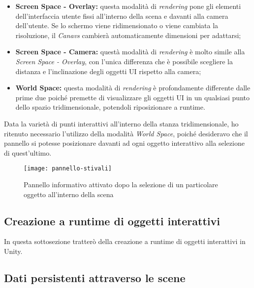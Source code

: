 \begin{itemize}
	\item \textbf{Screen Space - Overlay:} questa modalità di \textit{rendering} pone gli elementi dell'interfaccia utente fissi all'interno della scena e davanti alla camera dell'utente. Se lo schermo viene ridimensionato o viene cambiata la risoluzione, il \textit{Canavs} cambierà automaticamente dimensioni per adattarsi;
	\item \textbf{Screen Space - Camera:} questà modalità di \textit{rendering} è molto simile alla \textit{Screen Space - Overlay}, con l'unica differenza che è possibile scegliere la distanza e l'inclinazione degli oggetti UI rispetto alla camera;
	\item \textbf{World Space:} questa modalità di \textit{rendering} è profondamente differente dalle prime due poiché premette di visualizzare gli oggetti UI in un qualsiasi punto dello spazio tridimensionale, potendoli riposizionare a runtime.
\end{itemize}

Data la varietà di punti interattivi all'interno della stanza tridimensionale, ho ritenuto necessario l'utilizzo della modalità \textit{World Space}, poiché desideravo che il pannello si potesse posizionare davanti ad ogni oggetto interattivo alla selezione di quest'ultimo.

\label{Pannello informativo}
\begin{figure}[ht]
	\begin{center}
		\texttt{[image: pannello-stivali]}
		\caption{Pannello informativo attivato dopo la selezione di un particolare oggetto all'interno della scena}
	\end{center}
\end{figure}
\FloatBarrier

\subsection{Creazione a runtime di oggetti interattivi}

In questa sottosezione tratterò della creazione a runtime di oggetti interattivi in Unity.

\subsection{Dati persistenti attraverso le scene}

